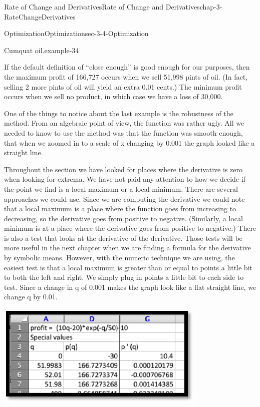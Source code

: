 \documentclass[oneside,10pt,]{book}
\numberwithin{equation}{section}
\begin{document}
\begin{chapterptx}{Rate of Change and Derivatives}{}{Rate of Change and Derivatives}{}{}{chap-3-RateChangeDerivatives}
\begin{sectionptx}{Optimization}{}{Optimization}{}{}{sec-3-4-Optimization}
\begin{example}{Cumquat oil.}{example-34}
\begin{sidebyside}{1}{0.15}{0.15}{0}
\end{sidebyside}%
\par
\hypertarget{p-1214}{}%
If the default definition of ``close enough'' is good enough for our purposes, then the maximum profit of \textdollar{}166,727 occurs when we sell 51,998 pints of oil.  (In fact, selling 2 more pints of oil will yield an extra 0.01 cents.)  The minimum profit occurs when we sell no product, in which case we have a loss of \textdollar{}30,000.%
\end{example}
\hypertarget{p-1215}{}%
One of the things to notice about the last example is the robustness of the method.  From an algebraic point of view, the function was rather ugly.  All we needed to know to use the method was that the function was smooth enough, that when we zoomed in to a scale of x changing by 0.001 the graph looked like a straight line.%
\par
\hypertarget{p-1216}{}%
Throughout the section we have looked for places where the derivative is zero when looking for extrema.  We have not paid any attention to how we decide if the point we find is a local maximum or a local minimum.  There are several approaches we could use.  Since we are computing the derivative we could note that a local maximum is a place where the function goes from increasing to decreasing, so the derivative goes from positive to negative.  (Similarly, a local minimum is at a place where the derivative goes from positive to negative.)  There is also a test that looks at the derivative of the derivative.  Those tests will be more useful in the next chapter when we are finding a formula for the derivative by symbolic means.  However, with the numeric technique we are using, the easiest test is that a local maximum is greater than or equal to points a little bit to both the left and right.  We simply plug in points a little bit to each side to test.  Since a change in q of 0.001 makes the graph look like a flat straight line, we change q by 0.01.%
\begin{sidebyside}{1}{0.25}{0.25}{0}%
\begin{sbspanel}{0.5}%
\includegraphics[width=1\linewidth]{images/sec3-4-5.png}

\end{sbspanel}
\end{sidebyside}
\end{sectionptx}
\end{chapterptx}
\end{document}
